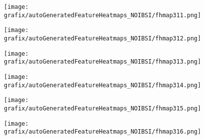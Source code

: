 \hspace{\hsp} 
\begin{subfigure}{\wid\textwidth} 
    \centering 
    \caption{\tiny \sffamily {}} 
    \vspace{\vsp} 
    \texttt{[image: grafix/autoGeneratedFeatureHeatmaps\_NOIBSI/fhmap311.png]} 
\end{subfigure} 
\hspace{\hsp} 
\begin{subfigure}{\wid\textwidth} 
    \centering 
    \caption{\tiny \sffamily {}} 
    \vspace{\vsp} 
    \texttt{[image: grafix/autoGeneratedFeatureHeatmaps\_NOIBSI/fhmap312.png]} 
\end{subfigure} 
\hspace{\hsp} 
\begin{subfigure}{\wid\textwidth} 
    \centering 
    \caption{\tiny \sffamily {}} 
    \vspace{\vsp} 
    \texttt{[image: grafix/autoGeneratedFeatureHeatmaps\_NOIBSI/fhmap313.png]} 
\end{subfigure} 
\hspace{\hsp} 
\begin{subfigure}{\wid\textwidth} 
    \centering 
    \caption{\tiny \sffamily {}} 
    \vspace{\vsp} 
    \texttt{[image: grafix/autoGeneratedFeatureHeatmaps\_NOIBSI/fhmap314.png]} 
\end{subfigure} 
\hspace{\hsp} 
\begin{subfigure}{\wid\textwidth} 
    \centering 
    \caption{\tiny \sffamily {}} 
    \vspace{\vsp} 
    \texttt{[image: grafix/autoGeneratedFeatureHeatmaps\_NOIBSI/fhmap315.png]} 
\end{subfigure} 
\hspace{\hsp} 
\begin{subfigure}{\wid\textwidth} 
    \centering 
    \caption{\tiny \sffamily {}} 
    \vspace{\vsp} 
    \texttt{[image: grafix/autoGeneratedFeatureHeatmaps\_NOIBSI/fhmap316.png]} 
\end{subfigure} 
\hspace{\hsp} 
